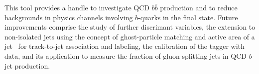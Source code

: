 This tool provides a handle to investigate QCD $b\bar{b}$ production and to reduce backgrounds in physics channels involving $b$-quarks in the final state.  Future improvements comprise the study of further discrimant variables, the extension to non-isolated jets using the concept of ghost-particle matching and active area of a jet~\cite{CatchmentArea} for track-to-jet association and labeling, the calibration of the tagger with data, and its application to measure the fraction of gluon-splitting jets in QCD $b$-jet production.







